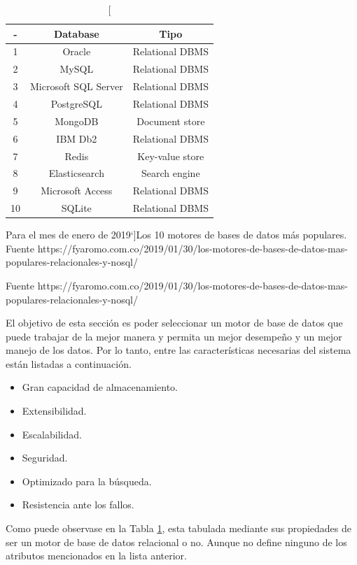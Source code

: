 \begin{table}[htdp]
\centering
\begin{tabular}{||c | c | c ||}
\hline
\hline
\textbf{-} & \textbf{Database} & \textbf{Tipo} \\
\hline
\hline
1 & Oracle & Relational DBMS \\
\hline
\hline
2 & MySQL & Relational DBMS \\
\hline
\hline
3 & Microsoft SQL Server & Relational DBMS \\
\hline
\hline
4 & PostgreSQL & Relational DBMS \\
\hline
\hline
5 & MongoDB & Document store \\
\hline
\hline
6 & IBM Db2 & Relational DBMS \\
\hline
\hline
7 & Redis & Key-value store \\
\hline
\hline
8 & Elasticsearch & Search engine \\
\hline
\hline
9 & Microsoft Access & Relational DBMS \\
\hline
\hline
10 & SQLite & Relational DBMS \\
\hline
\hline
\end{tabular}
\caption[Para el mes de enero de 2019`]{Los 10 motores de bases de datos más populares. \\ Fuente https://fyaromo.com.co/2019/01/30/los-motores-de-bases-de-datos-mas-populares-relacionales-y-nosql/}
\label{tab:tabla-db-list} 
\end{table}
Fuente https://fyaromo.com.co/2019/01/30/los-motores-de-bases-de-datos-mas-populares-relacionales-y-nosql/

El objetivo de esta sección es poder seleccionar un motor de base de datos que puede trabajar de la mejor manera y permita un mejor desempeño y un mejor manejo de los datos. Por lo tanto, entre las características necesarias del sistema están listadas a continuación.

\begin{itemize}
\item Gran capacidad de almacenamiento.
\item Extensibilidad.
\item Escalabilidad.
\item Seguridad.
\item Optimizado para la búsqueda.
\item Resistencia ante los fallos.
\end{itemize}

Como puede observase en la Tabla \ref{tab:tabla-db-list}, esta tabulada mediante sus propiedades de ser un motor de base de datos relacional o no. Aunque no define ninguno de los atributos mencionados en la lista anterior. 

